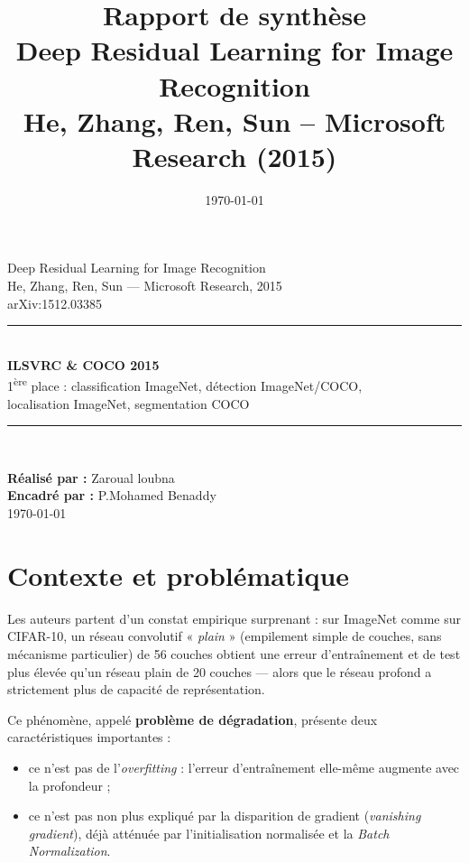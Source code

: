 \documentclass[a4paper,11pt]{article}
\title{\textbf{Rapport de synthèse} \\[0.3cm] \Large Deep Residual Learning for Image Recognition \\[0.1cm] \large He, Zhang, Ren, Sun -- Microsoft Research (2015)}
\author{}
\date{\today}
\begin{document}
\begin{titlepage}
    \centering
    \vspace*{2cm}

    {\Large Deep Residual Learning for Image Recognition}\\[0.3cm]
    {\large He, Zhang, Ren, Sun --- Microsoft Research, 2015}\\[0.3cm]
    {\normalsize arXiv:1512.03385}\\[2cm]

    \rule{\linewidth}{0.5mm}\\[0.4cm]
    {\Large \textbf{ILSVRC \& COCO 2015}}\\[0.2cm]
    {\large 1\textsuperscript{ère} place : classification ImageNet, détection ImageNet/COCO,\\ localisation ImageNet, segmentation COCO}\\[0.4cm]
    \rule{\linewidth}{0.5mm}\\[3cm]

    \vfill
     \begin{flushright}
        \large \textbf{Réalisé par :} Zaroual loubna  \\[0.3cm]
         \large \textbf{Encadré par :} P.Mohamed Benaddy  \\[0.3cm]
        \large \today
    \end{flushright}
 
    
\end{titlepage}


\tableofcontents
\newpage

\section{Contexte et problématique}
Les auteurs partent d'un constat empirique surprenant : sur ImageNet comme sur CIFAR-10, un réseau convolutif « \emph{plain} » (empilement simple de couches, sans mécanisme particulier) de 56 couches obtient une erreur d'entraînement et de test plus élevée qu'un réseau plain de 20 couches --- alors que le réseau profond a strictement plus de capacité de représentation.

Ce phénomène, appelé \textbf{problème de dégradation}, présente deux caractéristiques importantes :
\begin{itemize}
    \item ce n'est pas de l'\emph{overfitting} : l'erreur d'entraînement elle-même augmente avec la profondeur ;
    \item ce n'est pas non plus expliqué par la disparition de gradient (\emph{vanishing gradient}), déjà atténuée par l'initialisation normalisée et la \emph{Batch Normalization}.
\end{itemize}
\end{document}
